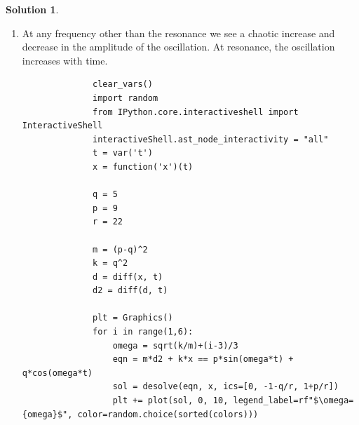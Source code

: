 \documentclass[10pt]{article}
\makeatletter
\theoremstyle{definition}
\newtheorem{soln}{Solution}
\newcommand{\boxspacing}{\kern\kvtcb@left@rule\kern\kvtcb@boxsep}
\newcommand{\prompt}[4]{
    \ttfamily\llap{{\color{#2}[#3]:\hspace{3pt}#4}}\vspace{-\baselineskip}
}
\makeatother
\begin{document}
\begin{soln} ~
  \begin{enumerate}[label=(\alph*)]
    \item At any frequency other than the resonance we see a chaotic increase and decrease in the amplitude of the oscillation.
          At resonance, the oscillation increases with time.
          \begin{tcolorbox}[breakable, size=fbox, boxrule=1pt, pad at break*=1mm,colback=cellbackground, colframe=cellborder]
            \prompt{In}{incolor}{1}{\boxspacing}
            \begin{verbatim}
              clear_vars()
              import random
              from IPython.core.interactiveshell import InteractiveShell
              interactiveShell.ast_node_interactivity = "all"
              t = var('t')
              x = function('x')(t)

              q = 5
              p = 9
              r = 22

              m = (p-q)^2
              k = q^2
              d = diff(x, t)
              d2 = diff(d, t)

              plt = Graphics()
              for i in range(1,6):
                  omega = sqrt(k/m)+(i-3)/3
                  eqn = m*d2 + k*x == p*sin(omega*t) + q*cos(omega*t)
                  sol = desolve(eqn, x, ics=[0, -1-q/r, 1+p/r])
                  plt += plot(sol, 0, 10, legend_label=rf"$\omega={omega}$", color=random.choice(sorted(colors)))


\end{verbatim}
\end{tcolorbox}
\end{enumerate}
\end{soln}
\end{document}

